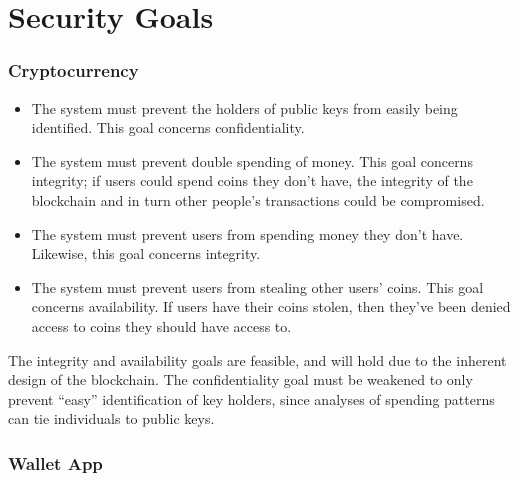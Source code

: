 \documentclass[12pt]{article}
\begin{document}
\section{Security Goals}

\subsubsection*{Cryptocurrency}
\begin{itemize}
\item The system must prevent the holders of public keys from easily being identified. This goal concerns confidentiality.
\item The system must prevent double spending of money. This goal concerns integrity; if users could spend coins they don't have, the integrity of the blockchain and in turn other people's transactions could be compromised.
\item The system must prevent users from spending money they don't have. Likewise, this goal concerns integrity.
\item The system must prevent users from stealing other users' coins. This goal concerns availability. If users have their coins stolen, then they've been denied access to coins they should have access to.
\end{itemize}

The integrity and availability goals are feasible, and will hold due to the inherent design of the blockchain. The confidentiality goal must be weakened to only prevent ``easy'' identification of key holders, since analyses of spending patterns can tie individuals to public keys.

\subsubsection*{Wallet App}

\end{document}
